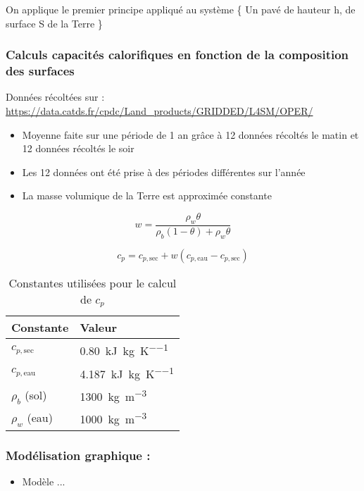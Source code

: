 \documentclass[a4paper,12pt]{article}
\begin{document}
On applique le premier principe appliqué au système \{ Un pavé de hauteur h, de surface S de la Terre \}
\ \ 
\[

\]

\subsubsection*{Calculs capacités calorifiques en fonction de la composition des surfaces}
Données récoltées sur : 
\url{https://data.catds.fr/cpdc/Land_products/GRIDDED/L4SM/OPER/}

\begin{itemize}
    \item Moyenne faite sur une période de 1 an grâce à 12 données récoltés le matin et 12 données récoltés le soir 
    \item Les 12 données ont été prise à des périodes différentes sur l'année 
    \item La masse volumique de la Terre est approximée constante 
\end{itemize}
\[
w = \frac{\rho_w \theta}{\rho_b (1 - \theta) + \rho_w \theta}
\]

\[
c_p = c_{p,\text{sec}} + w (c_{p,\text{eau}} - c_{p,\text{sec}})
\]
\begin{table}[h!]
\centering
\begin{tabular}{ll}
\textbf{Constante} & \textbf{Valeur} \\
\hline
$c_{p,\text{sec}}$ & \SI{0.80}{\kilo\joule\per\kilogram\per\kelvin} \\
$c_{p,\text{eau}}$ & \SI{4.187}{\kilo\joule\per\kilogram\per\kelvin} \\
$\rho_b$ (sol) & \SI{1300}{\kilogram\per\cubic\metre} \\
$\rho_w$ (eau) & \SI{1000}{\kilogram\per\cubic\metre} \\
\end{tabular}
\caption*{Constantes utilisées pour le calcul de $c_p$}
\end{table}














\subsubsection*{Modélisation graphique :} 
\begin{itemize}
    \item Modèle ...
\end{itemize}
\end{document}
